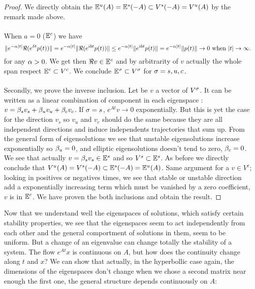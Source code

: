 \begin{definition}
\begin{proof}
We directly obtain the $\mathbb{E}^u(A) = \mathbb{E}^s(-A) \subset V^s(-A) = V^u(A)$ by the remark made above.
\\ \\
When $a=0$ ($\mathbb{E}^c$) we have
$$\|e^{-\alpha |t|}\Re(e^{\delta t}p(t))\|
= e^{-\alpha |t|}\|\Re(e^{ibt}p(t))\|
\leq e^{-\alpha |t|}\|e^{ibt}p(t)\|
= e^{-\alpha |t|}\|p(t)\| \to0 \text{ when }|t|\to\infty.$$
for any $\alpha>0$. We get then $\Re v \in \mathbb{E}^c$ and by arbitrarity of $v$ actually the whole span respect $\mathbb{E}^c\subset V^c$. We conclude $\mathbb{E}^\sigma\subset V^\sigma$ for $\sigma=s,u,c$.
\\ \\
Secondly, we prove the inverse inclusion.
Let be $v$ a vector of $V^\sigma$. It can be written as a linear combination of component in each eigenspace :
$v = \beta_s v_s + \beta_u v_u + \beta_c v_c$. If $\sigma=s$, $e^{At}v\to0$ exponentially. But this is yet the case for the direction $v_s$ so $v_u$ and $v_c$ should do the same because they are all independent directions and induce independents trajectories that sum up. From the general form of eigensolutions we see that unstable eigensolutions increase exponentially so  $\beta_u=0$, and elliptic eigensolutions doesn't tend to zero, $\beta_c=0$. We see that actually $v = \beta_s v_s\in \mathbb{E}^s$ and so $V^s\subset \mathbb{E}^s$. As before we directly conclude that $V^u(A)=V^s(-A)\subset \mathbb{E}^s(-A)=\mathbb{E}^u(A)$. Same argument for a $v\in V^c$; looking in positives or negatives times, we see that stable or unstable direction add a exponentially increasing term which must be vanished by a zero coefficient, $v$ is in $\mathbb{E}^c$.
We have proven the both inclusions and obtain the result.
\end{proof}

Now that we understand well the eigenspaces of solutions, which satisfy certain stability properties, we see that the eigenspaces seem to act independently from each other and the general comportment of solutions in them, seem to be uniform. But a change of an eigenvalue can change totally the stability of a system. The flow $e^{At}x$ is continuous on $A$, but how does the continuity change along $t$ and $x$? We can show that actually, in the hyperbollic case again, the dimensions of the eigenspaces don't change when we chose a second matrix near enough the first one, the general structure depends continuously on $A$:
\end{definition}

